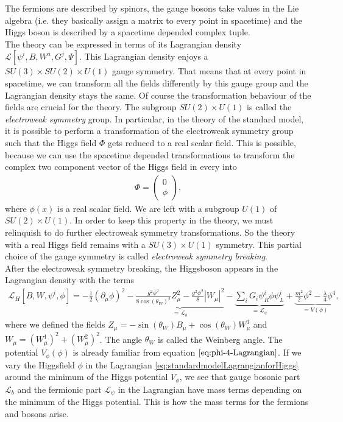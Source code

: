 \documentclass{article}
\numberwithin{equation}{section}
\begin{document}
The fermions are described by spinors, the gauge bosons take values in the Lie algebra (i.e. they basically assign a matrix to every point in spacetime) and the Higgs boson is described by a spacetime depended complex  tuple. \\
The theory can be expressed in terms of its Lagrangian density $\mathcal{L}[\psi^{i}, B, W^{a}, G^{j}, \Psi]$. This Lagrangian density enjoys a $SU(3) \times SU(2) \times U(1)$ gauge symmetry. 
That means that at every point in spacetime, we can transform  all the fields differently by this gauge group and the Lagrangian density stays the same. Of course the transformation behaviour of the fields are crucial for the theory. The subgroup $SU(2)\times U(1)$ is called the \textit{electroweak symmetry} group. In particular, in the theory of the standard model, it is possible to perform a transformation of the electroweak symmetry group such that the Higgs field $\Phi$ gets reduced to a real scalar field. This is possible, because we can use the spacetime depended transformations to transform the complex two component vector of the Higgs field in every into 
\begin{align*}
    \Phi = \begin{pmatrix} 0 \\ \phi\end{pmatrix}, 
\end{align*}
where $\phi(x)$ is a real scalar field. We are left with a subgroup $U(1)$ of $SU(2) \times U(1)$. 
In order to keep this property in the theory, we must relinquish to do further electroweak symmetry transformations. So the theory with a real Higgs field remains with a $SU(3) \times U(1)$ symmetry. This partial choice of the gauge symmetry is called \textit{electroweak symmetry breaking}. \\
After the electroweak symmetry breaking, the Higgsboson appears in the Lagrangian density with the terms%
\begin{align}
    \mathcal{L}_H[B, W, \psi^{i}, \phi] = -\frac{1}{2}(\partial_{\mu} \phi)^2 -\underbrace{\frac{g^2\phi^2}{8 \cos(\theta_{W})^2} Z_{\mu}^2-\frac{g^2 \phi^2}{8}|W_{\mu}|^2 }_{=\mathcal{L}_b } - \underbrace{\sum_{i}G_i\psi^{i}_R \phi \psi^{i}_L}_{=\mathcal{L}_{\psi}}+\underbrace{\frac{m^2}{2}\phi^2-\frac{\lambda}{4}\phi^4}_{ = V(\phi)} ,
    \label{eq:standardmodelLagrangianforHiggs}
\end{align}
where we defined the fields $Z_{\mu}  = -\sin(\theta_W)B_{\mu} + \cos(\theta_W)W^{3}_{\mu}$ and $W_{\mu} = (W^1_{\mu})^2 + (W^2_{\mu})^2$. The angle $\theta_W$ is called the Weinberg angle. The potential $V_{\phi}(\phi)$ is already familiar from equation $\eqref{eq:phi-4-Lagrangian}$. If we vary the Higgsfield $\phi$ in the Lagrangian \eqref{eq:standardmodelLagrangianforHiggs} around the minimum of the Higgs potential $V_{\phi}$, we see that gauge bosonic part $\mathcal{L}_{b}$ and the fermionic part $\mathcal{L}_{\psi}$ in the Lagrangian have mass terms depending on the minimum of the Higgs potential. This is how the mass terms for the fermions and bosons arise. \\
\end{document}
